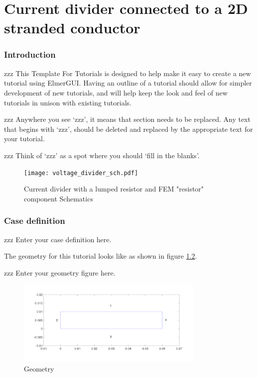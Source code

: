 \chapter{Current divider connected to a 2D stranded conductor }



\subsection*{Introduction}

zzz This Template For Tutorials is designed to help make it easy to create a new tutorial using ElmerGUI.  Having an outline of a tutorial should allow for simpler development of new tutorials, and will help keep the look and feel of new tutorials in unison with existing tutorials.

zzz Anywhere you see `zzz', it means that section needs to be replaced.  Any text that begins with `zzz', should be deleted and replaced by the appropriate text for your tutorial.  

zzz Think of `zzz' as a spot where you should `fill in the blanks'.

\begin{figure}[H]
\centering
\texttt{[image: voltage\_divider\_sch.pdf]}
\caption{Current divider with a lumped resistor and FEM "resistor" component Schematics}\label{fg:dc_current_divider}
\end{figure}  

\subsection*{Case definition}


zzz Enter your case definition here.

The geometry for this tutorial looks like as shown in figure \ref{fg:geometry}.

zzz Enter your geometry figure here.

\begin{figure}[H]
\centering
\includegraphics[width=0.8\textwidth]{geometry.png}
\caption{Geometry}\label{fg:geometry}
\end{figure}  

